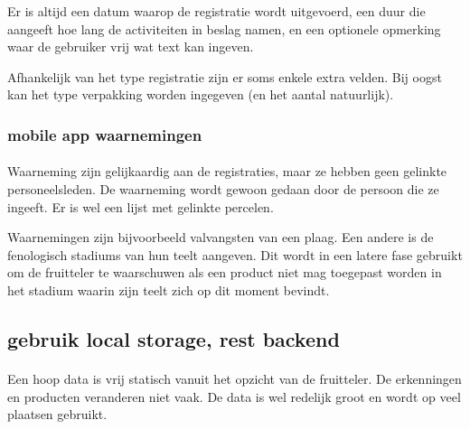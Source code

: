 Er is altijd een datum waarop de registratie wordt uitgevoerd, een duur die aangeeft
hoe lang de activiteiten in beslag namen, en een optionele opmerking waar de gebruiker
vrij wat text kan ingeven.

Afhankelijk van het type registratie zijn er soms enkele extra velden. Bij oogst kan het
type verpakking worden ingegeven (en het aantal natuurlijk).


\subsubsection {mobile app waarnemingen}

\paragraph {} Waarneming zijn gelijkaardig aan de registraties, maar ze hebben geen
gelinkte personeelsleden. De waarneming wordt gewoon gedaan door de persoon die ze
ingeeft. Er is wel een lijst met gelinkte percelen.

Waarnemingen zijn bijvoorbeeld valvangsten van een plaag. Een andere is de fenologisch
stadiums van hun teelt aangeven. Dit wordt in een latere fase gebruikt om de fruitteler te
waarschuwen als een product niet mag toegepast worden in het stadium waarin zijn teelt
zich op dit moment bevindt.


\subsection {gebruik local storage, rest backend}

\paragraph {} Een hoop data is vrij statisch vanuit het opzicht van de fruitteler. De
erkenningen en producten veranderen niet vaak. De data is wel redelijk groot en wordt op
veel plaatsen gebruikt.
